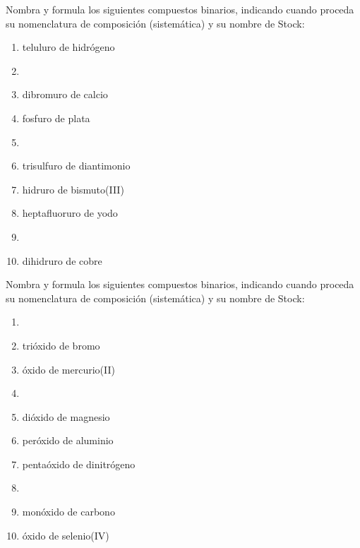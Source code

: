 \documentclass[10pt]{article}
\begin{document}
\begin{exercise}[
    tags    = {inorgánica,compuestos binarios,sales binarias,sales},
    topics  = {química inorgánica,formulación,nomenclatura},
    source  = {SAN Formulación, p26, e30},
  ]

  Nombra y formula los siguientes compuestos binarios, indicando cuando proceda su nomenclatura de composición (sistemática) y su nombre de Stock:

  \begin{enumerate}
    \item teluluro de hidrógeno
    \item {}
    \item dibromuro de calcio
    \item fosfuro de plata
    \item {}
    \item trisulfuro de diantimonio
    \item hidruro de bismuto(III)
    \item heptafluoruro de yodo
    \item {}
    \item dihidruro de cobre
  \end{enumerate}
\end{exercise}


\begin{exercise}[
    tags    = {inorgánica,compuestos binarios,oxidos,peróxidos},
    topics  = {química inorgánica,formulación,nomenclatura},
    source  = {SAN Formulación, p27, e31},
  ]

  Nombra y formula los siguientes compuestos binarios, indicando cuando proceda su nomenclatura de composición (sistemática) y su nombre de Stock:

  \begin{enumerate}
    \item {}
    \item trióxido de bromo
    \item óxido de mercurio(II)
    \item {}
    \item dióxido de magnesio
    \item peróxido de aluminio
    \item pentaóxido de dinitrógeno
    \item {}
    \item monóxido de carbono
    \item óxido de selenio(IV)
  \end{enumerate}
\end{exercise}
\end{document}

